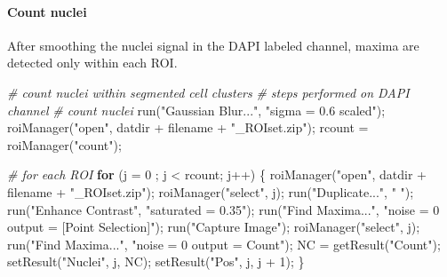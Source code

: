 \documentclass[10pt, b5paper, singlespacinge, twoside]{reedthesis} %
\newenvironment{Shaded}{}{}
\newcommand{\AttributeTok}[1]{#1}
\newcommand{\CommentTok}[1]{\textit{#1}}
\newcommand{\ControlFlowTok}[1]{\textbf{#1}}
\newcommand{\DecValTok}[1]{#1}
\newcommand{\FunctionTok}[1]{#1}
\newcommand{\NormalTok}[1]{#1}
\newcommand{\OtherTok}[1]{#1}
\newcommand{\SpecialCharTok}[1]{#1}
\newcommand{\StringTok}[1]{#1}
\theoremstyle{definition}
\theoremstyle{definition}
\theoremstyle{definition}
\theoremstyle{remark}
\begin{document}
\hypertarget{count-nuclei}{%
\paragraph{Count nuclei}\label{count-nuclei}}

After smoothing the nuclei signal in the DAPI labeled channel, maxima are detected only within each ROI.

\scriptsize
\begin{Shaded}
\begin{Highlighting}[numbers=left,,]
\CommentTok{\# count nuclei within segmented cell clusters}
\CommentTok{\# steps performed on DAPI channel}
\CommentTok{\# count nuclei}
    \FunctionTok{run}\NormalTok{(}\StringTok{"Gaussian Blur..."}\NormalTok{, }\StringTok{"sigma = 0.6 scaled"}\NormalTok{);}
    \FunctionTok{roiManager}\NormalTok{(}\StringTok{"open"}\NormalTok{, datdir }\SpecialCharTok{+}\NormalTok{ filename }\SpecialCharTok{+} \StringTok{"\_ROIset.zip"}\NormalTok{);}
\NormalTok{    rcount }\OtherTok{=} \FunctionTok{roiManager}\NormalTok{(}\StringTok{"count"}\NormalTok{);}

\CommentTok{\# for each ROI}
    \ControlFlowTok{for}\NormalTok{ (}\AttributeTok{j =} \DecValTok{0}\NormalTok{ ; j }\SpecialCharTok{\textless{}}\NormalTok{ rcount; j}\SpecialCharTok{++}\NormalTok{) \{}
        \FunctionTok{roiManager}\NormalTok{(}\StringTok{"open"}\NormalTok{, datdir }\SpecialCharTok{+}\NormalTok{ filename }\SpecialCharTok{+} \StringTok{"\_ROIset.zip"}\NormalTok{);}
        \FunctionTok{roiManager}\NormalTok{(}\StringTok{"select"}\NormalTok{, j);}
            \FunctionTok{run}\NormalTok{(}\StringTok{"Duplicate..."}\NormalTok{, }\StringTok{" "}\NormalTok{);}
            \FunctionTok{run}\NormalTok{(}\StringTok{"Enhance Contrast"}\NormalTok{, }\StringTok{"saturated = 0.35"}\NormalTok{);}
            \FunctionTok{run}\NormalTok{(}\StringTok{"Find Maxima..."}\NormalTok{, }\StringTok{"noise = 0 output = [Point Selection]"}\NormalTok{);}
            \FunctionTok{run}\NormalTok{(}\StringTok{"Capture Image"}\NormalTok{);}
        \FunctionTok{roiManager}\NormalTok{(}\StringTok{"select"}\NormalTok{, j);}
        \FunctionTok{run}\NormalTok{(}\StringTok{"Find Maxima..."}\NormalTok{, }\StringTok{"noise = 0 output = Count"}\NormalTok{);}
\NormalTok{        NC }\OtherTok{=} \FunctionTok{getResult}\NormalTok{(}\StringTok{"Count"}\NormalTok{);}
        \FunctionTok{setResult}\NormalTok{(}\StringTok{"Nuclei"}\NormalTok{, j, NC);}
        \FunctionTok{setResult}\NormalTok{(}\StringTok{"Pos"}\NormalTok{, j, j }\SpecialCharTok{+} \DecValTok{1}\NormalTok{);}
\NormalTok{    \}}
\end{Highlighting}
\end{Shaded}
\normalsize
\end{document}
